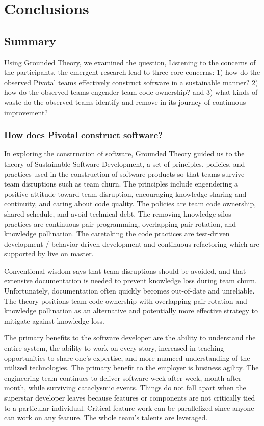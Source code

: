 

\chapter{Conclusions}
\label{ConclusionChapter}
\section{Summary}
Using Grounded Theory, we examined the question,  Listening to the concerns of the participants, the emergent research lead to three core concerns: 1) how do the observed Pivotal teams effectively construct software in a sustainable manner? 2) how do the observed teams engender team code ownership? and 3) what kinds of waste do the observed teams identify and remove in its journey of continuous improvement? 


\subsection{How does Pivotal construct software?}
In exploring the construction of software, Grounded Theory guided us to the theory of Sustainable Software Development, a set of principles, policies, and practices used in the construction of software products so that teams survive team disruptions such as team churn. The principles include engendering a positive attitude toward team disruption, encouraging knowledge sharing and continuity, and caring about code quality. The policies are team code ownership, shared schedule, and avoid technical debt. The removing knowledge silos practices are continuous pair programming, overlapping pair rotation, and knowledge pollination. The caretaking the code practices are test-driven development / behavior-driven development and continuous refactoring which are supported by live on master.


Conventional wisdom says that team disruptions should be avoided, and that extensive documentation is needed to prevent knowledge loss during team churn. Unfortunately, documentation often quickly becomes out-of-date and unreliable. The theory positions team code ownership with overlapping pair rotation and knowledge pollination as an alternative and potentially more effective strategy to mitigate against knowledge loss.


The primary benefits to the software developer are the ability to understand the entire system, the ability to work on every story, increased in teaching opportunities to share one's expertise, and more nuanced understanding of the utilized technologies.
The primary benefit to the employer is business agility. The engineering team continues to deliver software week after week, month after month, while surviving cataclysmic events. Things do not fall apart when the superstar developer leaves because features or components are not critically tied to a particular individual. Critical feature work can be parallelized since anyone can work on any feature. The whole team's talents are leveraged.


